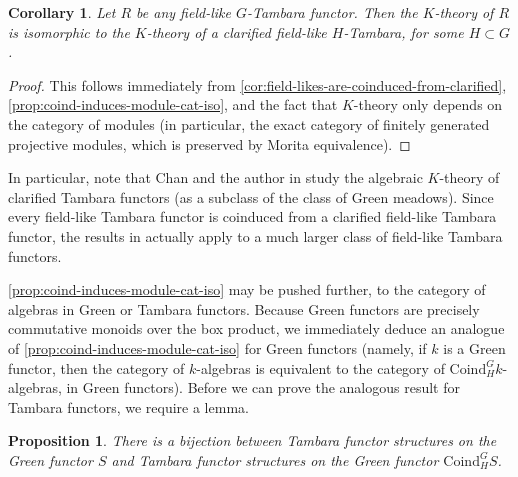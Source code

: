 \documentclass[11pt,dvipsnames]{amsart}
\newtheorem{proposition}[theorem]{Proposition}
\newtheorem{corollary}[theorem]{Corollary}
\theoremstyle{BoldRemark}
\begin{document}
\begin{corollary}\label{cor:K-theory-of-field-like}
	Let $R$ be any field-like $G$-Tambara functor. Then the $K$-theory of $R$ is isomorphic to the $K$-theory of a clarified field-like $H$-Tambara, for some $H \subset G$.
\end{corollary}

\begin{proof}
	This follows immediately from \cref{cor:field-likes-are-coinduced-from-clarified}, \cref{prop:coind-induces-module-cat-iso}, and the fact that $K$-theory only depends on the category of modules (in particular, the exact category of finitely generated projective modules, which is preserved by Morita equivalence).
\end{proof}

In particular, note that Chan and the author in \cite{CW25} study the algebraic $K$-theory of clarified Tambara functors (as a subclass of the class of Green meadows). Since every field-like Tambara functor is coinduced from a clarified field-like Tambara functor, the results in \cite{CW25} actually apply to a much larger class of field-like Tambara functors.

\cref{prop:coind-induces-module-cat-iso} may be pushed further, to the category of algebras in Green or Tambara functors. Because Green functors are precisely commutative monoids over the box product, we immediately deduce an analogue of \cref{prop:coind-induces-module-cat-iso} for Green functors (namely, if $k$ is a Green functor, then the category of $k$-algebras is equivalent to the category of $\mathrm{Coind}_H^G k$-algebras, in Green functors). Before we can prove the analogous result for Tambara functors, we require a lemma.

\begin{proposition}\label{prop:coind-has-unique-Tamb-structure}
	There is a bijection between Tambara functor structures on the Green functor $S$ and Tambara functor structures on the Green functor $\mathrm{Coind}_H^G S$.
\end{proposition}
\end{document}

